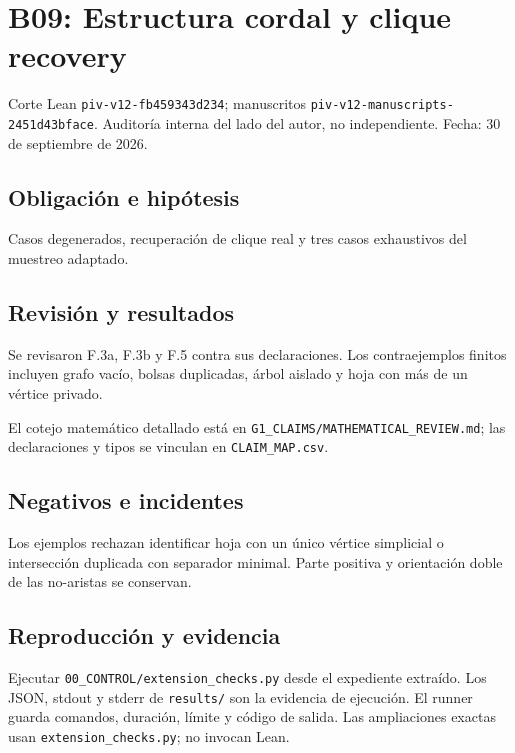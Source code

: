 \section{B09: Estructura cordal y clique
recovery}\label{b09-estructura-cordal-y-clique-recovery}

Corte Lean \texttt{piv-v12-fb459343d234}; manuscritos
\texttt{piv-v12-manuscripts-2451d43bface}. Auditoría interna del lado
del autor, no independiente. Fecha: 30 de septiembre de 2026.

\subsection{Obligación e hipótesis}\label{obligaciuxf3n-e-hipuxf3tesis}

Casos degenerados, recuperación de clique real y tres casos exhaustivos
del muestreo adaptado.

\subsection{Revisión y resultados}\label{revisiuxf3n-y-resultados}

Se revisaron F.3a, F.3b y F.5 contra sus declaraciones. Los
contraejemplos finitos incluyen grafo vacío, bolsas duplicadas, árbol
aislado y hoja con más de un vértice privado.

El cotejo matemático detallado está en
\texttt{G1\_CLAIMS/MATHEMATICAL\_REVIEW.md}; las declaraciones y tipos
se vinculan en \texttt{CLAIM\_MAP.csv}.

\subsection{Negativos e incidentes}\label{negativos-e-incidentes}

Los ejemplos rechazan identificar hoja con un único vértice simplicial o
intersección duplicada con separador minimal. Parte positiva y
orientación doble de las no-aristas se conservan.

\subsection{Reproducción y evidencia}\label{reproducciuxf3n-y-evidencia}

Ejecutar \texttt{00\_CONTROL/extension\_checks.py} desde el expediente
extraído. Los JSON, stdout y stderr de \texttt{results/} son la
evidencia de ejecución. El runner guarda comandos, duración, límite y
código de salida. Las ampliaciones exactas usan
\texttt{extension\_checks.py}; no invocan Lean.

